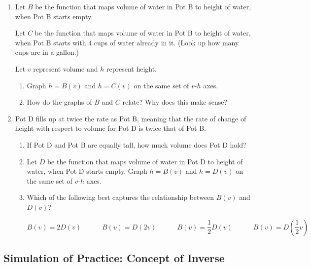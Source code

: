 \documentclass[11pt]{article}
\theoremstyle{definition}
\begin{document}
\begin{enumerate}[resume]
\item \label{h: horizontal shift intro}
Let $B$ be the function that maps volume of water in Pot B to height of water, when Pot B starts empty.

Let $C$ be the function that maps volume of water in Pot B to height of water, when Pot B starts with 4 cups of water already in it. (Look up how many cups are in a gallon.)

Let $v$ represent volume and $h$ represent height.
	\begin{enumerate}
		\item Graph $h=B(v)$ and $h=C(v)$ on the same set of $v$-$h$ axes.
		\item How do the graphs of $B$ and $C$ relate? Why does this make sense?
	\end{enumerate}

\item \label{h: horizontal scale intro}
Pot D fills up at twice the rate as Pot B, meaning that the rate of change of height with respect to volume for Pot D is twice that of Pot B. 
	\begin{enumerate}
	\item If Pot D and Pot B are equally tall, how much volume does Pot D hold?
	\item Let $D$ be the function that maps volume of water in Pot D to height of water, when Pot D starts empty. Graph $h=B(v)$ and $h=D(v)$ on the same set of $v$-$h$ axes.
	\item Which of the following best captures the relationship between $B(v)$ and $D(v)$?
	
		
		$$B(v)=2D(v) \quad\quad \quad
		B(v)=D(2v) \quad\quad \quad
		B(v)=\frac{1}{2}D(v) \quad\quad\quad 
		B(v)=D(\frac{1}{2}v) $$
		
	\end{enumerate}
\end{enumerate}



\newpage \subsection{Simulation of Practice: Concept of Inverse}

\end{document}

